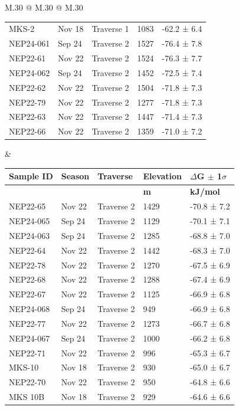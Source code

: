 \begin{landscape}
\begin{table}
\begin{tabular}{M{.30\textwidth} @{\hspace{4cm}} M{.30\textwidth} @{\hspace{4cm}} M{.30\textwidth}}
\begin{tabular}{l l l l l}
    MKS-2 & Nov 18 & Traverse 1 & 1083 & -62.2 ±  6.4 \\
    \specialrule{0.2pt}{1pt}{1pt}
    NEP24-061 & Sep 24 & Traverse 2 & 1527 & -76.4 ±  7.8 \\
    NEP22-61 & Nov 22 & Traverse 2 & 1524 & -76.3 ±  7.7 \\
    NEP24-062 & Sep 24 & Traverse 2 & 1452 & -72.5 ±  7.4 \\
    NEP22-62 & Nov 22 & Traverse 2 & 1504 & -71.8 ±  7.3 \\
    NEP22-79 & Nov 22 & Traverse 2 & 1277 & -71.8 ±  7.3 \\
    NEP22-63 & Nov 22 & Traverse 2 & 1447 & -71.4 ±  7.3 \\
    NEP22-66 & Nov 22 & Traverse 2 & 1359 & -71.0 ±  7.2 \\
    \hline
    \end{tabular}
    &
    \begin{tabular}{l l l l l}
        \setlength\tabcolsep{0.1cm}
\textbf{Sample ID}  &  \textbf{Season}  &  \textbf{Traverse}  &  \textbf{Elevation}  &  \textbf{$\Delta$G $\pm$ 1$\sigma$} \\
\hline
&   &   &  \textbf{m}  &  \textbf{kJ/mol} \\
\hline
    NEP22-65 & Nov 22 & Traverse 2 & 1429 & -70.8 ±  7.2 \\
    NEP24-065 & Sep 24 & Traverse 2 & 1129 & -70.1 ±  7.1 \\
    NEP24-063 & Sep 24 & Traverse 2 & 1285 & -68.8 ±  7.0 \\
    NEP22-64 & Nov 22 & Traverse 2 & 1442 & -68.3 ±  7.0 \\
    NEP22-78 & Nov 22 & Traverse 2 & 1270 & -67.5 ±  6.9 \\
    NEP22-68 & Nov 22 & Traverse 2 & 1288 & -67.4 ±  6.9 \\
    NEP22-67 & Nov 22 & Traverse 2 & 1125 & -66.9 ±  6.8 \\
    NEP24-068 & Sep 24 & Traverse 2 & 949 & -66.9 ±  6.8 \\
    NEP22-77 & Nov 22 & Traverse 2 & 1273 & -66.7 ±  6.8 \\
    NEP24-067 & Sep 24 & Traverse 2 & 1000 & -66.2 ±  6.8 \\
    NEP22-71 & Nov 22 & Traverse 2 & 996 & -65.3 ±  6.7 \\
    MKS-10 & Nov 18 & Traverse 2 & 930 & -65.0 ±  6.7 \\
    NEP22-70 & Nov 22 & Traverse 2 & 950 & -64.8 ±  6.6 \\
    MKS 10B & Nov 18 & Traverse 2 & 929 & -64.6 ±  6.6 \\

\end{tabular}
\end{tabular}
\end{table}
\end{landscape}
